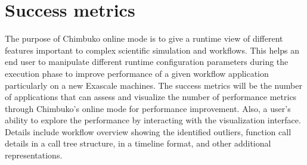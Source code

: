 \section{Success metrics}

The purpose of Chimbuko  online mode is to give a runtime view of different features important to complex scientific simulation and workflows. This helps an end user to manipulate different runtime configuration parameters during  the execution phase to improve  performance of a given workflow application particularly on a new Exascale machines. The success metrics  will be the number of applications that  can assess  and visualize the number of  performance metrics through Chimbuko's online mode for performance improvement.
Also, a user's ability to explore the performance by interacting with the visualization interface. Details include workflow overview showing the identified outliers, function call details in a call tree structure, in a timeline format, and other additional representations. 
